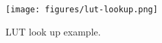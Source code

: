 






\begin{figure}[t]
\small
\centering
\texttt{[image: figures/lut-lookup.png]}
\vspace{-.2in}
\caption{ LUT look up example.}
\vspace{-.2in}
\label{fig:lut-lookup}
\end{figure}


